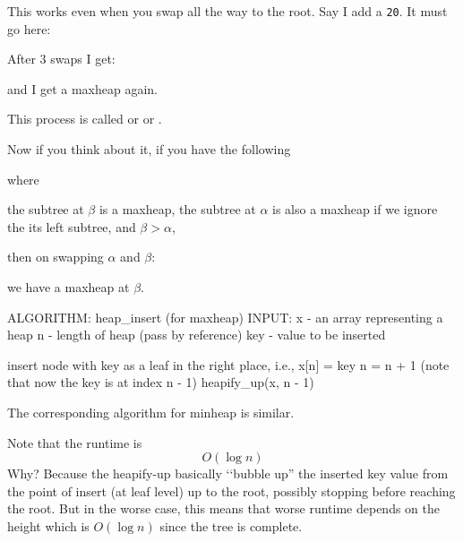 This works even when you swap all the way to the root.
Say I add a \verb!20!.
It must go here:



After 3 swaps I get:



and I get a maxheap again.

This process is called
or
or
.


  
Now if you think about it,
if you have the following


where 
\begin{tightlist}
\li the subtree at $\beta$ is a maxheap,
\li the subtree at $\alpha$ is also a maxheap if we ignore the 
its left subtree, 
\li and $\beta > \alpha$, 
\end{tightlist}
then
on swapping $\alpha$ and $\beta$:


we have a maxheap at $\beta$.

\begin{console}[commandchars=\\\{\}]
ALGORITHM: heap_insert (for maxheap)
INPUT: x - an array representing a heap
       n - length of heap (pass by reference)
       key - value to be inserted

insert node with key as a leaf in the right place, i.e.,
x[n] = key
n = n + 1 (note that now the key is at index n - 1)
heapify_up(x, n - 1)
\end{console}

The corresponding algorithm for minheap is similar.

Note that the runtime is
\[
O(\log n)
\]
Why?
Because the heapify-up basically \lq\lq bubble up''
the inserted key value from the point of insert (at leaf level)
up to the root,
possibly stopping before reaching the root.
But in the worse case, this means that
worse runtime depends on the height which is $O(\log n)$
since the tree is complete.








